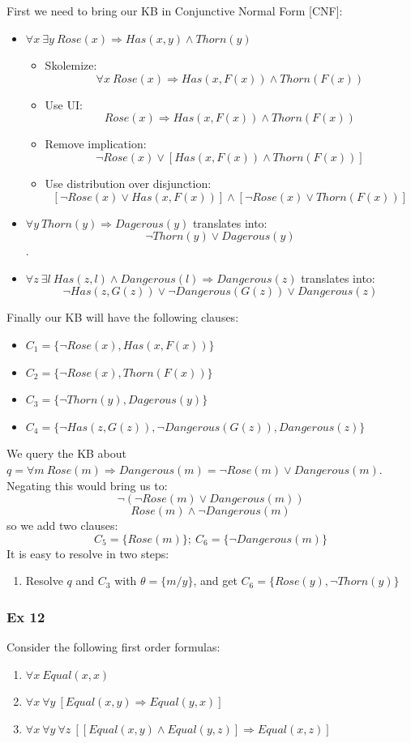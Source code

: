 \documentclass[10pt,a4paper]{article}
\begin{document}
\begin{itemize}
First we need to bring our KB in Conjunctive Normal Form [CNF]:
\begin{itemize}
\item $\forall x\ \exists y \ Rose(x) \Rightarrow Has(x,y)\wedge Thorn(y)$
\begin{itemize}
\item Skolemize:
\[\forall x\ Rose(x) \Rightarrow Has(x,F(x))\wedge Thorn(F(x))\]
\item Use UI:
\[Rose(x) \Rightarrow Has(x,F(x))\wedge Thorn(F(x))\]
\item Remove implication:
\[\neg Rose(x) \vee [Has(x,F(x))\wedge Thorn(F(x))]\]
\item Use distribution over disjunction:
\[[\neg Rose(x) \vee Has(x,F(x))] \wedge [\neg Rose(x) \vee Thorn(F(x))]\]

\end{itemize}
\item $\forall y\ Thorn(y) \Rightarrow Dagerous(y)$ translates into:
\[\neg Thorn(y) \vee Dagerous(y)\].
\item $\forall z\ \exists l\ Has(z,l)\wedge Dangerous(l) \Rightarrow Dangerous(z)$ translates into:
\[\neg Has(z,G(z))\vee \neg Dangerous(G(z)) \vee Dangerous(z)\]

\end{itemize}

Finally our KB will have the following clauses:
\begin{itemize}
\item $C_1=\lbrace \neg Rose(x) , Has(x,F(x))\rbrace$
\item $C_2=\lbrace \neg Rose(x) , Thorn(F(x)) \rbrace$
\item $C_3=\lbrace \neg Thorn(y), Dagerous(y) \rbrace$
\item $C_4=\lbrace \neg Has(z,G(z)), \neg Dangerous(G(z)) , Dangerous(z) \rbrace$
\end{itemize}
We query the KB about $q=\forall m\ Rose(m) \Rightarrow Dangerous(m)=\neg Rose(m) \vee Dangerous(m)$. Negating this would bring us to:
\[\neg (\neg Rose(m) \vee Dangerous(m))\]
\[  Rose(m) \wedge \neg Dangerous(m)\]
 so we add two clauses:
\[C_5=\lbrace  Rose(m)\rbrace;\ C_6=\lbrace \neg  Dangerous(m)\rbrace\]
It is easy to resolve in two steps:
\begin{enumerate}
\item Resolve $q$ and $C_3$ with $\theta=\{m/y\}$, and get $C_6=\lbrace Rose(y), \neg Thorn(y)\rbrace$
\end{enumerate}

\subsubsection{Ex 12}
Consider the following first order formulas:
\begin{enumerate}
\item $\forall x\ Equal(x,x)$
\item $\forall x\ \forall y\ [Equal(x,y) \Rightarrow Equal(y,x)]$
\item $\forall x\ \forall y\ \forall z\ [[Equal(x,y)\wedge Equal(y,z)]\Rightarrow Equal(x,z)]$
\end{enumerate}


\end{itemize}
\end{document}
